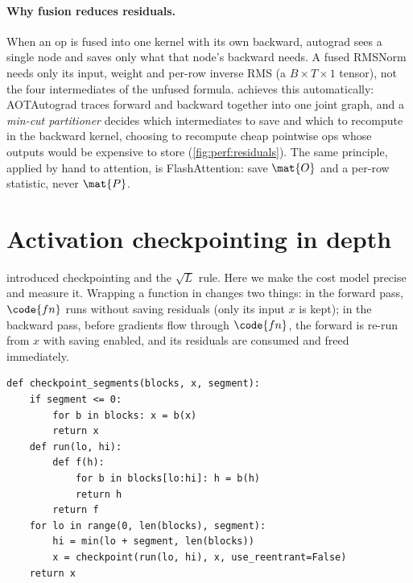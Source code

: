 \paragraph{Why fusion reduces residuals.} When an op is fused into one kernel with its own
backward, autograd sees a single node and saves only what that node's backward needs. A fused
RMSNorm needs only its input, weight and per-row inverse RMS (a $B\times T\times1$ tensor), not
the four intermediates of the unfused formula.  achieves this automatically:
AOTAutograd traces forward and backward together into one joint graph, and a \emph{min-cut
partitioner} decides which intermediates to save and which to recompute in the backward kernel,
choosing to recompute cheap pointwise ops whose outputs would be expensive to store
(\cref{fig:perf:residuals}). The same principle, applied by hand to attention, is FlashAttention:
save $\mat{O}$ and a per-row statistic, never $\mat{P}$.

\section{Activation checkpointing in depth}\label{sec:perf:ckpt}

 introduced checkpointing and the $\sqrt L$ rule. Here we make the
cost model precise and measure it. Wrapping a function in
 changes two things: in the
forward pass, $\code{fn}$ runs without saving residuals (only its input $x$ is kept); in the backward
pass, before gradients flow through $\code{fn}$, the forward is re-run from $x$ with saving enabled,
and its residuals are consumed and freed immediately.

\begin{lstlisting}[caption={Checkpointing groups of blocks (from \texttt{llmsys/perf.py}).},label={lst:perf:ckptseg}]
def checkpoint_segments(blocks, x, segment):
    if segment <= 0:
        for b in blocks: x = b(x)
        return x
    def run(lo, hi):
        def f(h):
            for b in blocks[lo:hi]: h = b(h)
            return h
        return f
    for lo in range(0, len(blocks), segment):
        hi = min(lo + segment, len(blocks))
        x = checkpoint(run(lo, hi), x, use_reentrant=False)
    return x
\end{lstlisting}

